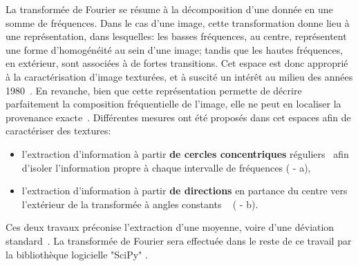 La transformée de Fourier se résume à la décomposition d'une donnée en une somme de fréquences. Dans le cas d'une image, cette transformation donne lieu à une représentation, dans lesquelles: les basses fréquences, au centre, représentent une forme d'homogénéité au sein d'une image; tandis que les hautes fréquences, en extérieur, sont associées à de fortes transitions. Cet espace est donc approprié à la caractérisation d'image texturées, et à suscité un intérêt au milieu des années 1980~\cite{Persoon1986}. En revanche, bien que cette représentation permette de décrire parfaitement la composition fréquentielle de l'image, elle ne peut en localiser la provenance exacte~\cite{Wiltgen2008}. Différentes  mesures ont été proposés dans cet espaces afin de caractériser des textures:
\begin{itemize}
    \item l'extraction d'information à partir \textbf{de cercles concentriques} réguliers~\cite{Smach2008a, Wiltgen2008} afin d'isoler l'information propre à chaque intervalle de fréquences ( - a),
    \item l'extraction d'information à partir \textbf{de directions} en partance du centre vers l'extérieur de la transformée à angles constants ~\cite{Wiltgen2008} ( - b).
\end{itemize}
Ces deux travaux préconise l'extraction d'une moyenne, voire d'une déviation standard~\cite{Smach2008a, Wiltgen2008}. La transformée de Fourier sera effectuée dans le reste de ce travail par la bibliothèque logicielle "SciPy" \cite{Virtanen2020}.\par\par

